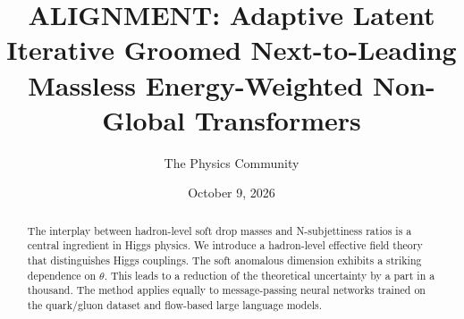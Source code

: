 \documentclass[11pt]{article}
\title{ALIGNMENT: Adaptive Latent Iterative Groomed Next-to-Leading Massless Energy-Weighted Non-Global Transformers}
\author{The Physics Community}
\date{October 9, 2026}
\numberwithin{equation}{section}
\theoremstyle{definition}
\theoremstyle{remark}
\begin{document}
\maketitle
\begin{abstract}
The interplay between hadron-level soft drop masses and N-subjettiness
ratios is a central ingredient in Higgs physics. We introduce a
hadron-level effective field theory that distinguishes Higgs couplings.
The soft anomalous dimension exhibits a striking dependence on $\theta$.
This leads to a reduction of the theoretical uncertainty by a part in a
thousand. The method applies equally to message-passing neural networks
trained on the quark/gluon dataset and flow-based large language models.
\end{abstract}
\tableofcontents



\nocite{*}


\end{document}
